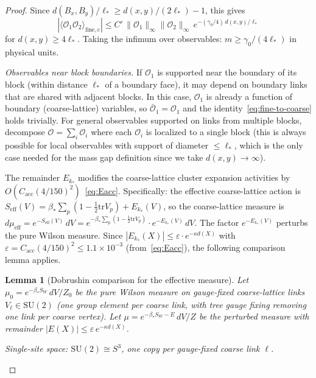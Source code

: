 \documentclass[11pt]{article}
\newtheorem{lemma}[theorem]{Lemma}
\theoremstyle{definition}
\newcommand{\SU}{\mathrm{SU}}
\newcommand{\tr}{\mathrm{tr}}
\begin{document}
\begin{proof}
Since $d(B_x,B_y)/\ell_*\ge d(x,y)/(2\ell_*)-1$, this gives
\begin{equation}
|\langle\mathcal{O}_1\mathcal{O}_2\rangle_{\mathrm{fine},c}|
\le C'\,\|\mathcal{O}_1\|_\infty\|\mathcal{O}_2\|_\infty\,
e^{-(\gamma_0/4)\,d(x,y)/\ell_*}
\end{equation}
for $d(x,y)\ge 4\ell_*$.  Taking the infimum over observables:
$m\ge\gamma_0/(4\ell_*)$ in physical units.

\emph{Observables near block boundaries.}
If $\mathcal{O}_1$ is supported near the boundary of its block
(within distance $\ell_*$ of a boundary face), it may depend on
boundary links that are shared with adjacent blocks.
In this case, $\mathcal{O}_1$ is already a function of boundary
(coarse-lattice) variables, so $\bar{\mathcal{O}}_1=\mathcal{O}_1$
and the identity~\eqref{eq:fine-to-coarse} holds trivially.
For general observables supported on links from multiple blocks,
decompose $\mathcal{O}=\sum_i\mathcal{O}_i$ where each $\mathcal{O}_i$
is localized to a single block (this is always possible for local
observables with support of diameter $\le\ell_*$, which is the only
case needed for the mass gap definition since we take
$d(x,y)\to\infty$).

The remainder $E_{k_*}$ modifies the coarse-lattice cluster expansion
activities by $O(C_{\mathrm{acc}}(4/150)^2)$~\eqref{eq:Eacc}.
Specifically: the effective coarse-lattice action is
$S_{\mathrm{eff}}(V)=\beta_*\sum_p(1-\frac{1}{2}\tr V_p)+E_{k_*}(V)$,
so the coarse-lattice measure is
$d\mu_{\mathrm{eff}}=e^{-S_{\mathrm{eff}}(V)}\,dV
=e^{-\beta_*\sum_p(1-\frac{1}{2}\tr V_p)}\cdot e^{-E_{k_*}(V)}\,dV$.
The factor $e^{-E_{k_*}(V)}$ perturbs the pure Wilson measure.
Since $|E_{k_*}(X)|\le\varepsilon\cdot e^{-\kappa d(X)}$ with
$\varepsilon=C_{\mathrm{acc}}(4/150)^2\le 1.1\times 10^{-3}$
(from~\eqref{eq:Eacc}), the following comparison lemma applies.

\begin{lemma}[Dobrushin comparison for the effective measure]%
\label{lem:dobrushin-comparison}
Let $\mu_0=e^{-\beta_* S_W}\,dV/Z_0$ be the pure Wilson
measure on gauge-fixed coarse-lattice links
$V_\ell\in\SU(2)$ (one group element per coarse link,
with tree gauge fixing removing one link per coarse vertex).
Let $\mu=e^{-\beta_* S_W-E}\,dV/Z$ be the perturbed measure
with remainder $|E(X)|\le\varepsilon\,e^{-\kappa d(X)}$.

\emph{Single-site space:} $\SU(2)\cong S^3$, one copy per
gauge-fixed coarse link $\ell$.


\end{lemma}
\end{proof}
\end{document}
